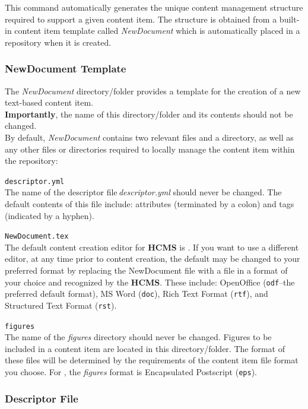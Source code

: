 \documentclass[12pt]{article}
\begin{document}
This command automatically generates the unique content management structure required to support a given content item. The structure is obtained from a built-in content item template called {\it NewDocument} which is automatically placed in a repository when it is created.

\subsubsection*{NewDocument Template}

The {\it NewDocument} directory/folder provides a template for the creation of a new text-based content item.\\
{\bf Importantly}, the name of this directory/folder and its contents should not be changed.\\
By default, {\it NewDocument} contains two relevant files and a directory, as well as any other {\bf \small} files or directories required to locally manage the content item within the repository:

\begin{description} 
	\item {\tt descriptor.yml}\\
	The name of the descriptor file\,{\it descriptor.yml} should never be changed. The default contents of this file include: attributes (terminated by a colon) and tags (indicated by a hyphen).
	\item {\tt NewDocument.tex}\\
	The default content creation editor for {\bf \small HCMS} is \LaTeXe. If you want to use a different editor, at any time prior to content creation, the default may be changed to your preferred format by replacing the NewDocument file with a file in a format of your choice and recognized by the {\bf \small HCMS}. These include: OpenOffice ({\tt odf}--the preferred default format), MS Word ({\tt doc}), Rich Text Format ({\tt rtf}), and Structured Text Format ({\tt rst}).
	\item {\tt figures}\\
	The name of the {\it figures} directory should never be changed. Figures to be included in a content item are located in this directory/folder. The format of these files will be determined by the requirements of the content item file format you choose. For \LaTeXe, the {\it figures} format is Encapsulated Postscript ({\tt eps}).
\end{description}

\subsubsection*{Descriptor File}
\end{document}
